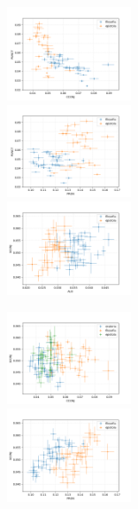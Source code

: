 \documentclass[10pt,a4paper,onecolumn]{article}
\theoremstyle{definition}
\theoremstyle{remark}
\begin{document}
\begin{figure}[htpb!]
	\centering
	\begin{multicols}{3}
		\includegraphics[width=0.33\textwidth]{graficos/PUNCT_x_CCONJ.png}  \\
		\includegraphics[width=0.33\textwidth]{graficos/PUNCT_x_PRON.png}  \\
		\includegraphics[width=0.33\textwidth]{graficos/SCONJ_x_AUX.png}  \\
	\end{multicols}\vspace{-0.8cm}
	\begin{multicols}{3}
		\includegraphics[width=0.33\textwidth]{graficos/SCONJ_x_CCONJ.png}  \\
		\includegraphics[width=0.33\textwidth]{graficos/SCONJ_x_PRON.png}  \\

\end{multicols}
\end{figure}
\end{document}
